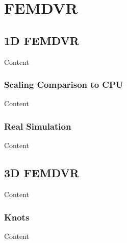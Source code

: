 
\chapter{FEMDVR} %

\label{ch:femdvr} %


\section{1D FEMDVR}

Content


\subsection{Scaling Comparison to CPU}

Content


\subsection{Real Simulation}

Content


\section{3D FEMDVR}

Content


\subsection{Knots}

Content